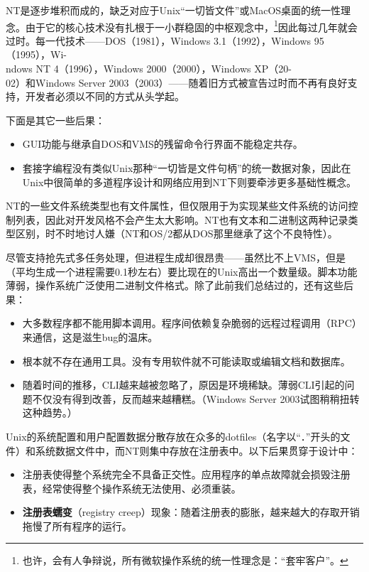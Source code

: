 \documentclass[12pt,oneside]{ctexbook}
\begin{document}
\begin{common-format}
NT是逐步堆积而成的，缺乏对应于Unix“一切皆文件”或MacOS桌面的统一性理念。由于它的核心技术没有扎根于一小群稳固的中枢观念中，\footnote{也许，会有人争辩说，所有微软操作系统的统一性理念是：“套牢客户”。}因此每过几年就会过时。每一代技术——DOS（1981），Windows 3.1（1992），Windows 95（1995），Wi-\\ndows NT 4（1996），Windows 2000（2000），Windows XP（20-\\02）和Windows Server 2003（2003）——随着旧方式被宣告过时而不再有良好支持，开发者必须以不同的方式从头学起。

下面是其它一些后果：
\begin{itemize}
\item GUI功能与继承自DOS和VMS的残留命令行界面不能稳定共存。
\item 套接字编程没有类似Unix那种“一切皆是文件句柄”的统一数据对象，因此在Unix中很简单的多道程序设计和网络应用到NT下则要牵涉更多基础性概念。
\end{itemize}

NT的一些文件系统类型也有文件属性，但仅限用于为实现某些文件系统的访问控制列表，因此对开发风格不会产生太大影响。NT也有文本和二进制这两种记录类型区别，时不时地讨人嫌（NT和OS/2都从DOS那里继承了这个不良特性）。

尽管支持抢先式多任务处理，但进程生成却很昂贵——虽然比不上VMS，但是（平均生成一个进程需要0.1秒左右）要比现在的Unix高出一个数量级。脚本功能薄弱，操作系统广泛使用二进制文件格式。除了此前我们总结过的，还有这些后果：

\begin{itemize}
\item 大多数程序都不能用脚本调用。程序间依赖复杂脆弱的远程过程调用（RPC）来通信，这是滋生bug的温床。
\item 根本就不存在通用工具。没有专用软件就不可能读取或编辑文档和数据库。
\item 随着时间的推移，CLI越来越被忽略了，原因是环境稀缺。薄弱CLI引起的问题不仅没有得到改善，反而越来越糟糕。（Windows Server 2003试图稍稍扭转这种趋势。）
\end{itemize}

Unix的系统配置和用户配置数据分散存放在众多的dotfiles（名字以“．”开头的文件）和系统数据文件中，而NT则集中存放在注册表中。以下后果贯穿于设计中：

\begin{itemize}
\item 注册表使得整个系统完全不具备正交性。应用程序的单点故障就会损毁注册表，经常使得整个操作系统无法使用、必须重装。
\item \textbf{注册表蠕变}（registry creep）现象：随着注册表的膨胀，越来越大的存取开销拖慢了所有程序的运行。
\end{itemize}


\end{common-format}
\end{document}
